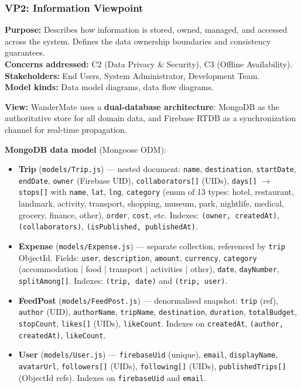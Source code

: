 \documentclass[12pt, a4paper]{article}
\newcommand{\code}[1]{\texttt{\small #1}}
\begin{document}
\subsubsection{VP2: Information Viewpoint}

\begin{tcolorbox}[notebox]
\textbf{Purpose:} Describes how information is stored, owned, managed, and accessed across the system. Defines the data ownership boundaries and consistency guarantees.\\[3pt]
\textbf{Concerns addressed:} C2 (Data Privacy \& Security), C3 (Offline Availability).\\[3pt]
\textbf{Stakeholders:} End Users, System Administrator, Development Team.\\[3pt]
\textbf{Model kinds:} Data model diagrams, data flow diagrams.
\end{tcolorbox}

\textbf{View:} WanderMate uses a \textbf{dual-database architecture}: MongoDB as the authoritative store for all domain data, and Firebase RTDB as a synchronization channel for real-time propagation.

\textbf{MongoDB data model} (Mongoose ODM):
\begin{itemize}
  \item \textbf{Trip} (\code{models/Trip.js}) --- nested document: \code{name}, \code{destination}, \code{startDate}, \code{endDate}, \code{owner} (Firebase UID), \code{collaborators[]} (UIDs), \code{days[]} $\rightarrow$ \code{stops[]} with \code{name}, \code{lat}, \code{lng}, \code{category} (enum of 13 types: hotel, restaurant, landmark, activity, transport, shopping, museum, park, nightlife, medical, grocery, finance, other), \code{order}, \code{cost}, etc. Indexes: \code{(owner, createdAt)}, \code{(collaborators)}, \code{(isPublished, publishedAt)}.
  \item \textbf{Expense} (\code{models/Expense.js}) --- separate collection, referenced by \code{trip} ObjectId. Fields: \code{user}, \code{description}, \code{amount}, \code{currency}, \code{category} (accommodation | food | transport | activities | other), \code{date}, \code{dayNumber}, \code{splitAmong[]}. Indexes: \code{(trip, date)} and \code{(trip, user)}.
  \item \textbf{FeedPost} (\code{models/FeedPost.js}) --- denormalised snapshot: \code{trip} (ref), \code{author} (UID), \code{authorName}, \code{tripName}, \code{destination}, \code{duration}, \code{totalBudget}, \code{stopCount}, \code{likes[]} (UIDs), \code{likeCount}. Indexes on \code{createdAt}, \code{(author, createdAt)}, \code{likeCount}.
  \item \textbf{User} (\code{models/User.js}) --- \code{firebaseUid} (unique), \code{email}, \code{displayName}, \code{avatarUrl}, \code{followers[]} (UIDs), \code{following[]} (UIDs), \code{publishedTrips[]} (ObjectId refs). Indexes on \code{firebaseUid} and \code{email}.
\end{itemize}
\end{document}
